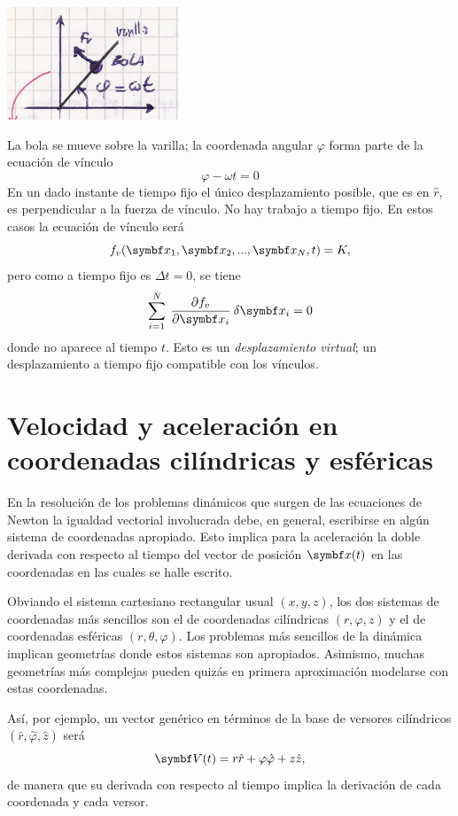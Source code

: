 \documentclass[10pt,oneside]{CBFT_book}
\begin{document}
\includegraphics[scale=0.4]{images/fig_mc_bola_varilla_rotante.jpg}

La bola se mueve sobre la varilla; la coordenada angular $\varphi$ forma parte de la ecuación de vínculo
\[
	\varphi - \omega t = 0
\]
En un dado instante de tiempo fijo el único desplazamiento posible, que es en $\hat{r}$, es perpendicular a la fuerza 
de vínculo. No hay trabajo a tiempo fijo.
En estos casos la ecuación de vínculo será
\[
	f_v(\vb{x}_1, \vb{x}_2, ..., \vb{x}_N, t ) = K,
\]
pero como a tiempo fijo es $\Delta t=0$, se tiene 
\[
	\sum_{i=1}^N \: \dpar{f_v}{\vb{x}_i}\:\delta{\vb{x}_i} = 0
\]
donde no aparece al tiempo $t$.
Esto es un {\it desplazamiento virtual}; un desplazamiento a tiempo fijo compatible con los vínculos.

\section{Velocidad y aceleración en coordenadas cilíndricas y esféricas}

En la resolución de los problemas dinámicos que surgen de las ecuaciones de Newton la igualdad vectorial involucrada debe,
en general, escribirse en algún sistema de coordenadas apropiado. 
Esto implica para la aceleración la doble derivada con respecto al tiempo del vector de posición $ \vb{x}(t) $ en las
coordenadas en las cuales se halle escrito. 

Obviando el sistema cartesiano rectangular usual $(x,y,z)$, los dos sistemas de coordenadas más sencillos son el de
coordenadas cilíndricas $(r,\varphi,z)$ y el de coordenadas esféricas $(r,\theta,\varphi)$. Los problemas más sencillos
de la dinámica implican geometrías donde estos sistemas son apropiados. Asimismo, muchas geometrías más complejas pueden
quizás en primera aproximación modelarse con estas coordenadas.

Así, por ejemplo, un vector genérico en términos de la base de versores cilíndricos $(\hat{r},\hat{\varphi},\hat{z})$ será
\[
	\vb{V}(t) = r \hat{r} + \varphi \hat{\varphi} + z \hat{z},
\]
de manera que su derivada con respecto al tiempo implica la derivación de cada coordenada y cada versor.
\end{document}
